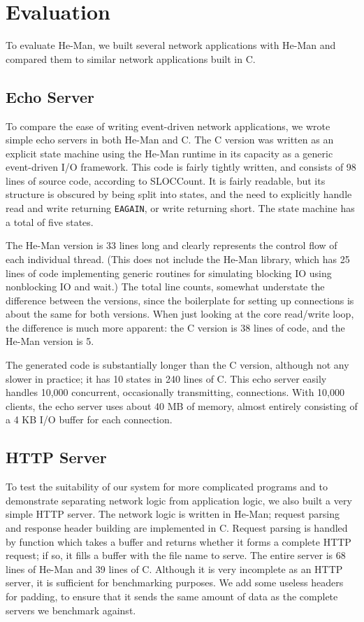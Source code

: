 \documentclass[preprint]{sigplanconf}
\renewcommand{\t}{\texttt}
\begin{document}
\section{Evaluation}\label{sec:evaluation}

To evaluate He-Man, we built several network applications with He-Man
and compared them to similar network applications built in C.

\subsection{Echo Server}

To compare the ease of writing event-driven network applications, we wrote
simple echo servers in both He-Man and C. The C version was written as an
explicit state machine using the He-Man runtime in its capacity as a generic
event-driven I/O framework.  This code is fairly tightly written, and consists
of 98 lines of source code, according to SLOCCount.  It is fairly readable, but
its structure is obscured by being split into states, and the need to explicitly
handle read and write returning \t{EAGAIN}, or write returning short. The state
machine has a total of five states.

The He-Man version is 33 lines long and clearly represents the control flow of
each individual thread. (This does not include the He-Man library, which has 25
lines of code implementing generic routines for simulating blocking IO using
nonblocking IO and wait.) The total line counts, somewhat understate the
difference between the versions, since the boilerplate for setting up
connections is about the same for both versions. When just looking at the core
read/write loop, the difference is much more apparent: the C version is 38 lines
of code, and the He-Man version is 5.

The generated code is substantially longer than the C version, although not any
slower in practice; it has 10 states in 240 lines of C. This echo server easily
handles 10,000 concurrent, occasionally transmitting, connections.  With 10,000
clients, the echo server uses about 40 MB of memory, almost entirely consisting
of a 4 KB I/O buffer for each connection.

\subsection{HTTP Server}

To test the suitability of our system for more complicated programs and to
demonstrate separating network logic from application logic, we also built a
very simple HTTP server. The network logic is written in He-Man; request parsing
and response header building are implemented in C. Request parsing is handled by
function which takes a buffer and returns whether it forms a complete HTTP
request; if so, it fills a buffer with the file name to serve. The entire server
is 68 lines of He-Man and 39 lines of C. Although it is very incomplete as an
HTTP server, it is sufficient for benchmarking purposes. We add some useless
headers for padding, to ensure that it sends the same amount of data as the
complete servers we benchmark against.
\end{document}
